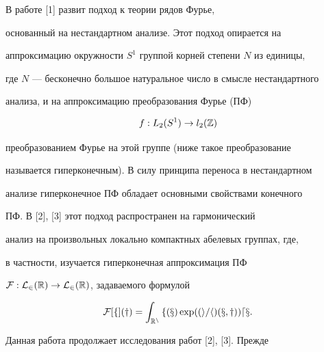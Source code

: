  


\date{} 




\pagestyle{plain} %


 




\maketitle 


\label{begin} 


 


 


В работе [1] развит подход к теории рядов Фурье, 


основанный на нестандартном анализе. Этот подход опирается на 


аппроксимацию окружности $S^1$ группой корней степени $N$ из единицы, 


где $N$ --- бесконечно большое натуральное число в смысле нестандартного 


анализа, и на аппроксимацию преобразования Фурье (ПФ) 


$$ 


f:L_2(S^1)\to l_2(\Bbb Z) 


$$ 


преобразованием Фурье на этой группе (ниже такое преобразование 


называется гиперконечным). В силу принципа переноса в нестандартном 


анализе гиперконечное ПФ обладает основными свойствами конечного 


ПФ. В [2], [3] этот подход распространен на гармонический 


анализ на произвольных локально компактных абелевых группах, где, 


в частности, изучается гиперконечная аппроксимация ПФ 


$\cal F:L_2(\Bbb R)\to L_2(\Bbb R)$, задаваемого формулой 


\begin{equation} 


\cal F[f](y)=\int_{\Bbb R^n}f(x)\exp((i/h)(x,y))dx. 


\end{equation} 


Данная работа продолжает исследования работ [2], [3]. Прежде 


